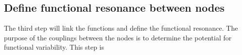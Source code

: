 \documentclass[10pt,oneside]{book}                  %
\begin{document}

\subsection{Define functional resonance between nodes}
The third step will link the functions and define the functional resonance. The purpose of the couplings between the nodes is to determine the potential for functional variability. This step is 
\end{document}
